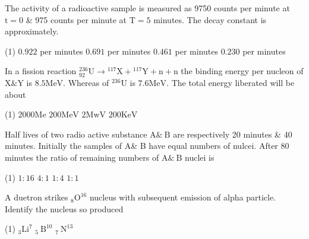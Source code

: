 \begin{enumerate}[ label=\color{ocre}\textbf{\arabic*.}]
\begin{minipage}{\textwidth}
	\item The activity of a radioactive sample is measured as 9750 counts per minute at $\mathrm{t}=0$ \& 975 counts per minute at $\mathrm{T}=5$ minutes. The decay constant is approximately.
\end{minipage}
\begin{tasks}(1)
	\task[\textbf{A.}]  $0.922$ per minutes
	\task[\textbf{B.}]  $0.691$ per minutes
	\task[\textbf{C.}]$0.461$ per minutes
	\task[\textbf{D.}]$0.230$ per minutes
\end{tasks}
\begin{minipage}{\textwidth}
	\item In a fission reaction
	 ${ }_{92}^{236} \mathrm{U} \rightarrow{ }^{117} \mathrm{X}+{ }^{117} \mathrm{Y}+\mathrm{n}+\mathrm{n}$ the binding energy per nucleon of $\mathrm{X} \& \mathrm{Y}$ is $8.5 \mathrm{MeV}$. Whereas of ${ }^{236} \mathrm{U}$ is $7.6 \mathrm{MeV}$. The total energy liberated will be about
\end{minipage}
\begin{tasks}(1)
	\task[\textbf{A.}] $2000 \mathrm{Me}$
	\task[\textbf{B.}] $200 \mathrm{MeV}$
	\task[\textbf{C.}]$2 \mathrm{MwV}$
	\task[\textbf{D.}]$200 \mathrm{KeV}$
\end{tasks}
\begin{minipage}{\textwidth}
	\item Half lives of two radio active substance $\mathrm{A} \& \mathrm{~B}$ are respectively 20 minutes \& 40 minutes. Initially the samples of A\& B have equal numbers of nulcei. After 80 minutes the ratio of remaining numbers of $\mathrm{A} \& \mathrm{~B}$ nuclei is
\end{minipage}
\begin{tasks}(1)
	\task[\textbf{A.}] $1: 16$
	\task[\textbf{B.}] $4: 1$
	\task[\textbf{C.}]$1: 4$
	\task[\textbf{D.}]$1: 1$
\end{tasks}
\begin{minipage}{\textwidth}
	\item A duetron strikes ${ }_{8} \mathrm{O}^{16}$ nucleus with subsequent emission of alpha particle. Identify the nucleus so produced
\end{minipage}
\begin{tasks}(1)
	\task[\textbf{A.}] ${ }_{3} \mathrm{Li}^{7}$
	\task[\textbf{B.}]  ${ }_{5} \mathrm{~B}^{10}$
	\task[\textbf{C.}]${ }_{7} \mathrm{~N}^{13}$

\end{tasks}
\end{enumerate}
